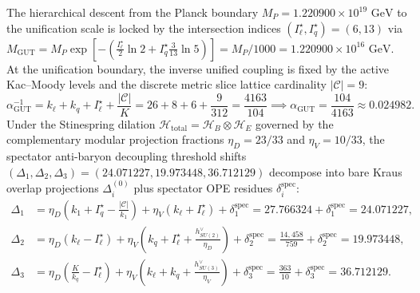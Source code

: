 \documentclass[11pt]{article}
\theoremstyle{plain}
\begin{document}
The hierarchical descent from the Planck boundary $M_P = 1.220900 \times 10^{19}\text{ GeV}$ to the unification scale is locked by the intersection indices $(I_\ell^\star, I_q^\star) = (6, 13)$ via $M_{\text{GUT}} = M_P \exp[-(\frac{I_\ell^\star}{2}\ln 2 + I_q^\star \frac{3}{13}\ln 5)] = M_P / 1000 = 1.220900 \times 10^{16}\text{ GeV}$. At the unification boundary, the inverse unified coupling is fixed by the active Kac--Moody levels and the discrete metric slice lattice cardinality $|\mathcal{C}| = 9$:
\begin{equation}
\alpha_{\text{GUT}}^{-1} = k_\ell + k_q + I_\ell^\star + \frac{|\mathcal{C}|}{K} = 26 + 8 + 6 + \frac{9}{312} = \frac{4163}{104} \implies \alpha_{\text{GUT}} = \frac{104}{4163} \approx 0.024982.
\label{eq:app_alpha_gut_exact_rational}
\end{equation}
Under the Stinespring dilation $\mathcal{H}_{\text{total}} = \mathcal{H}_B \otimes \mathcal{H}_E$ governed by the complementary modular projection fractions $\eta_D = 23/33$ and $\eta_V = 10/33$, the spectator anti-baryon decoupling threshold shifts $(\Delta_1, \Delta_2, \Delta_3) = (24.071227, 19.973448, 36.712129)$ decompose into bare Kraus overlap projections $\Delta_i^{(0)}$ plus spectator OPE residues $\delta_i^{\text{spec}}$:
\begin{align}
\Delta_1 &= \eta_D\!\left(k_1 + I_q^\star - \frac{|\mathcal{C}|}{k_1}\right) + \eta_V(k_\ell + I_\ell^\star) + \delta_1^{\text{spec}} = 27.766324 + \delta_1^{\text{spec}} = 24.071227, \label{eq:app_delta_1_closed} \\
\Delta_2 &= \eta_D(k_\ell - I_\ell^\star) + \eta_V\!\left(k_q + I_\ell^\star + \frac{h^\vee_{SU(2)}}{\eta_D}\right) + \delta_2^{\text{spec}} = \frac{14{,}458}{759} + \delta_2^{\text{spec}} = 19.973448, \label{eq:app_delta_2_closed} \\
\Delta_3 &= \eta_D\!\left(\frac{K}{k_q} - I_\ell^\star\right) + \eta_V\!\left(k_\ell + k_q + \frac{h^\vee_{SU(3)}}{\eta_V}\right) + \delta_3^{\text{spec}} = \frac{363}{10} + \delta_3^{\text{spec}} = 36.712129. \label{eq:app_delta_3_closed}
\end{align}
\end{document}
